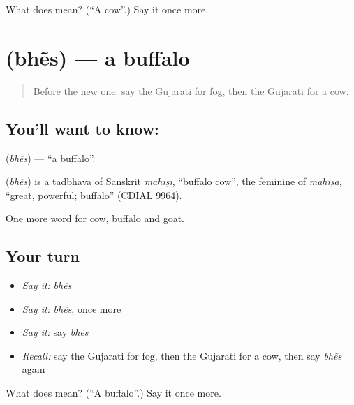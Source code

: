 \begin{tcolorbox}[breakable,colback=teal!4,colframe=teal!35!black,title={Before you move on}]
What does  mean? (\textquotedblleft{}A cow\textquotedblright{}.) Say it once more.
\end{tcolorbox}
\section[\texorpdfstring{\gu{ભેંસ} (bhẽs)}{ભેંસ (bhẽs)}]{ (bhẽs) — a buffalo}

\label{lesson:GU-C67-buffalo}



\begin{quote}
Before the new one: say the Gujarati for fog, then the Gujarati for a cow.
\end{quote}

\subsection*{You'll want to know: }
\textbf{} (\emph{bhẽs}) — \textquotedblleft{}a buffalo\textquotedblright{}.

\begin{cousinweb}
\textbf{} (\emph{bhẽs}) is a tadbhava of Sanskrit \emph{mahiṣī}, \textquotedblleft{}buffalo cow\textquotedblright{}, the feminine of \emph{mahiṣa}, \textquotedblleft{}great, powerful; buffalo\textquotedblright{} (CDIAL 9964).
\end{cousinweb}

\begin{grammarlens}[title={What you've built}]
One more word for cow, buffalo and goat.
\end{grammarlens}

\subsection*{Your turn}
\begin{itemize}
\raggedright
  \item \emph{Say it:} \emph{bhẽs}
  \item \emph{Say it:} \emph{bhẽs}, once more
  \item \emph{Say it:} say \emph{bhẽs}
  \item \emph{Recall:} say the Gujarati for fog, then the Gujarati for a cow, then say \emph{bhẽs} again
\end{itemize}

\begin{tcolorbox}[breakable,colback=teal!4,colframe=teal!35!black,title={Before you move on}]
What does  mean? (\textquotedblleft{}A buffalo\textquotedblright{}.) Say it once more.
\end{tcolorbox}
